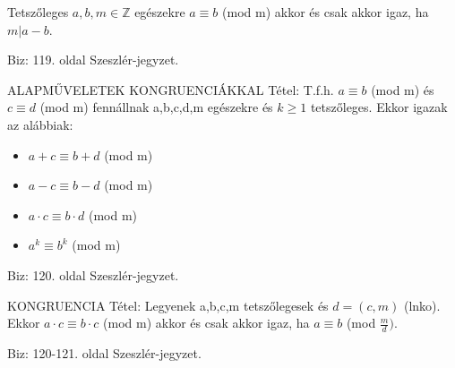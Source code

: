 \begin{tetel}{
Tetszőleges  $a,b,m\in\mathbb{Z}$ egészekre $a \equiv b$ (mod m) akkor és csak akkor igaz, ha $m|a-b$}.
\end{tetel}
\begin{leftbar}
Biz: 119. oldal Szeszlér-jegyzet.
\end{leftbar}
\begin{tetel}{
ALAPMŰVELETEK KONGRUENCIÁKKAL Tétel}: T.f.h. $a \equiv b$ (mod m) és $c \equiv d$ (mod m) fennállnak a,b,c,d,m egészekre és $k \geq 1$ tetszőleges. Ekkor igazak az alábbiak:
\begin{itemize}
\item $a + c \equiv b + d$ (mod m)
\item $a - c \equiv b - d$ (mod m)
\item $a \cdot c \equiv b \cdot d$ (mod m)
\item $a^k \equiv b^k$ (mod m)
\end{itemize}
\end{tetel}
\begin{leftbar}
Biz: 120. oldal Szeszlér-jegyzet.
\end{leftbar}
\begin{tetel}{
KONGRUENCIA Tétel}: Legyenek a,b,c,m tetszőlegesek és $d = (c,m)$ (lnko). Ekkor $a\cdot c \equiv b\cdot c$ (mod m) akkor és csak akkor igaz, ha $a \equiv b$ (mod $\frac{m}{d})$.
\end{tetel}
\begin{leftbar}
Biz: 120-121. oldal Szeszlér-jegyzet.
\end{leftbar}

